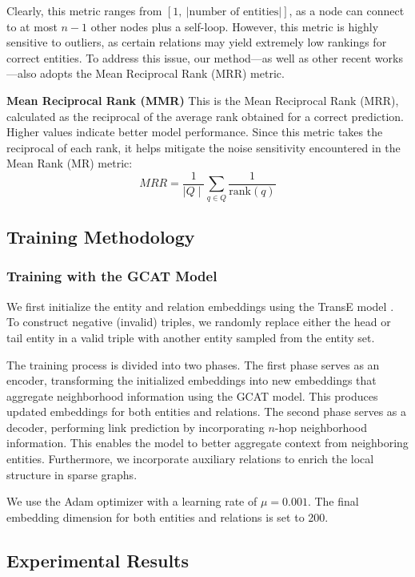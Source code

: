 Clearly, this metric ranges from \([1,~|\text{number of entities}|]\), as a node can connect to at most \(n-1\) other nodes plus a self-loop. However, this metric is highly sensitive to outliers, as certain relations may yield extremely low rankings for correct entities. To address this issue, our method—as well as other recent works—also adopts the Mean Reciprocal Rank (MRR) metric.


\textbf{Mean Reciprocal Rank (MMR)}
This is the Mean Reciprocal Rank (MRR), calculated as the reciprocal of the average rank obtained for a correct prediction. Higher values indicate better model performance. Since this metric takes the reciprocal of each rank, it helps mitigate the noise sensitivity encountered in the Mean Rank (MR) metric:
\[
MRR =\frac{1}{\mid Q \mid} \sum_{q \in Q} \frac{1}{\text{rank}(q)}
\]

\subsection{Training Methodology}

\subsubsection{Training with the GCAT Model}

We first initialize the entity and relation embeddings using the TransE model \cite{bordes2013translating}. To construct negative (invalid) triples, we randomly replace either the head or tail entity in a valid triple with another entity sampled from the entity set.

The training process is divided into two phases. The first phase serves as an encoder, transforming the initialized embeddings into new embeddings that aggregate neighborhood information using the GCAT model. This produces updated embeddings for both entities and relations. The second phase serves as a decoder, performing link prediction by incorporating $n$-hop neighborhood information. This enables the model to better aggregate context from neighboring entities. Furthermore, we incorporate auxiliary relations to enrich the local structure in sparse graphs.

We use the Adam optimizer with a learning rate of $\mu = 0.001$. The final embedding dimension for both entities and relations is set to 200. 


\subsection{Experimental Results}
\label{sec:Experiment}

